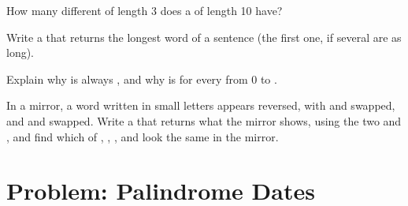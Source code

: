 \begin{exercise}[$\star\star$]\label{exo:g7:strings:9}
How many different   of length 3 does a  of length
10 have?
\end{exercise}

\begin{exercise}[$\star\star\star$]\label{exo:g7:strings:10}
Write a   that returns the longest word of a
sentence (the first one, if several are as long).
\end{exercise}

\begin{exercise}[$\star\star\star$]\label{exo:g7:strings:11}
Explain why  is always , and why
 is  for every  from 0 to .
\end{exercise}

\begin{exercise}[$\star\star\star$]\label{exo:g7:strings:12}
In a mirror, a word written in small letters appears reversed, with 
and  swapped, and  and  swapped. Write a 
 that returns what the mirror shows, using the two 
 and , and find which of , ,
,  and  look the same in the mirror.
\end{exercise}

\section{Problem: Palindrome Dates}

